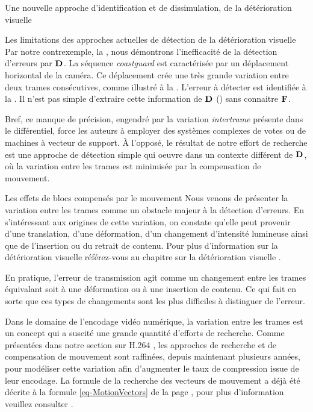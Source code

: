 \begin{chapter}{Une nouvelle approche d'identification et de dissimulation, de
la détérioration visuelle}
\begin{section}{Les limitations des approches actuelles de détection de la
détérioration visuelle}
Par notre contrexemple, la , nous démontrons
l'inefficacité de la détection d'erreurs par $\mathbf{D}_{}$. La séquence
\textit{coastguard} est caractérisée par un déplacement horizontal de la caméra.
Ce déplacement crée une très grande variation entre deux trames consécutives,
comme illustré à la . L'erreur à détecter est identifiée
à la . Il n'est pas simple d'extraire cette information
de $\mathbf{D}_{}$ () sans connaitre $\mathbf{F}_{}$.

Bref, ce manque de précision, engendré par la variation \textit{intertrame}
présente dans le différentiel, force les auteurs à employer des systèmes
complexes de votes ou de machines à vecteur de support. À l'opposé, le résultat
de notre effort de recherche est une approche de détection simple qui oeuvre
dans un contexte différent de $\mathbf{D}_{}$, où la variation entre les trames est
minimisée par la compensation de mouvement.
\FloatBarrier
\end{section}

\begin{section}{Les effets de blocs compensés par le mouvement}
\label{sect-MCB}
Nous venons de présenter la variation entre les trames comme un obstacle majeur
à la détection d'erreurs. En s'intéressant aux origines de cette variation, on
constate qu'elle peut provenir d'une translation, d'une déformation, d'un
changement d'intensité lumineuse ainsi que de l'insertion ou du retrait de
contenu. Pour plus d'information sur la détérioration visuelle référez-vous au
chapitre sur la détérioration visuelle .

En pratique, l'erreur de transmission agit comme un changement entre les trames
équivalant soit à une déformation ou à une insertion de contenu. Ce qui fait en
sorte que ces types de changements sont les plus difficiles à distinguer de
l'erreur.

Dans le domaine de l'encodage vidéo numérique, la variation entre les trames est
un concept qui a suscité une grande quantité d'efforts de recherche. Comme
présentées dans notre section sur H.264 , les approches de
recherche et de compensation de mouvement sont raffinées, depuis maintenant
plusieurs années, pour modéliser cette variation afin d'augmenter le taux de
compression issue de leur encodage. La formule de la recherche des vecteurs de
mouvement a déjà été décrite à la formule \ref{eq-MotionVectors} de la page
\pageref{eq-MotionVectors}, pour plus d'information veuillez consulter
\citep{Drew2004}.


\end{section}
\end{chapter}
